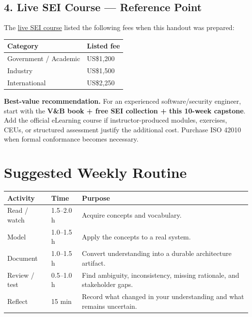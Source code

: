 \documentclass[10pt,letterpaper]{article}
\begin{document}
\subsection{4. Live SEI Course --- Reference Point}
The \href{https://www.sei.cmu.edu/training/documenting-software-architectures/}{live SEI course} listed the following fees when this handout was prepared:

\begin{tabularx}{\textwidth}{@{}P{0.42\textwidth}Y@{}}
\toprule
{}\textbf{Category} & \textbf{Listed fee} \\
\midrule
Government / Academic & US\$1,200 \\
Industry & US\$1,500 \\
International & US\$2,250 \\
\bottomrule
\end{tabularx}

\begin{keybox}
\textbf{Best-value recommendation.} For an experienced software/security engineer, start with the \textbf{V\&B book + free SEI collection + this 10-week capstone}. Add the official eLearning course if instructor-produced modules, exercises, CEUs, or structured assessment justify the additional cost. Purchase ISO 42010 when formal conformance becomes necessary.
\end{keybox}

\section{Suggested Weekly Routine}

\begin{tabularx}{\textwidth}{@{}P{0.22\textwidth}P{0.18\textwidth}Y@{}}
\toprule
{}\color{white}\textbf{Activity} & \color{white}\textbf{Time} & \color{white}\textbf{Purpose} \\
\midrule
Read / watch & 1.5--2.0 h & Acquire concepts and vocabulary. \\
Model & 1.0--1.5 h & Apply the concepts to a real system. \\
Document & 1.0--1.5 h & Convert understanding into a durable architecture artifact. \\
Review / test & 0.5--1.0 h & Find ambiguity, inconsistency, missing rationale, and stakeholder gaps. \\
Reflect & 15 min & Record what changed in your understanding and what remains uncertain. \\
\bottomrule
\end{tabularx}
\end{document}
